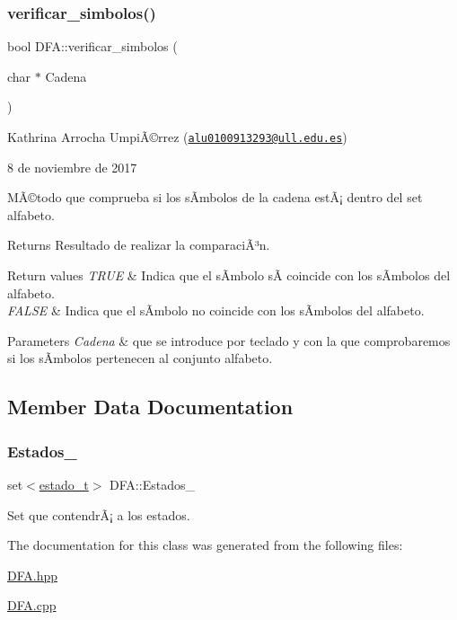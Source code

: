 \subsubsection{\texorpdfstring{verificar\+\_\+simbolos()}{verificar\_simbolos()}}
{\footnotesize\ttfamily bool D\+F\+A\+::verificar\+\_\+simbolos (\begin{DoxyParamCaption}\item[{char $\ast$}]{Cadena }\end{DoxyParamCaption})}

Kathrina Arrocha UmpiÃ©rrez (\href{mailto:alu0100913293@ull.edu.es}{\tt alu0100913293@ull.\+edu.\+es})

8 de noviembre de 2017

MÃ©todo que comprueba si los sÃ­mbolos de la cadena estÃ¡ dentro del set alfabeto.

\begin{DoxyReturn}{Returns}
Resultado de realizar la comparaciÃ³n. 
\end{DoxyReturn}

\begin{DoxyRetVals}{Return values}
{\em T\+R\+UE} & Indica que el sÃ­mbolo sÃ­ coincide con los sÃ­mbolos del alfabeto. \\
\hline
{\em F\+A\+L\+SE} & Indica que el sÃ­mbolo no coincide con los sÃ­mbolos del alfabeto.\\
\hline
\end{DoxyRetVals}

\begin{DoxyParams}{Parameters}
{\em Cadena} & que se introduce por teclado y con la que comprobaremos si los sÃ­mbolos pertenecen al conjunto alfabeto. \\
\hline
\end{DoxyParams}


\subsection{Member Data Documentation}
\mbox{\label{class_d_f_a_a6030e3446246552a16a7de723b08964e}} 
\subsubsection{\texorpdfstring{Estados\+\_\+}{Estados\_}}
{\footnotesize\ttfamily set$<$\hyperlink{classestado__t}{estado\+\_\+t}$>$ D\+F\+A\+::\+Estados\+\_\+}

Set que contendrÃ¡ a los estados. 

The documentation for this class was generated from the following files\+:\begin{DoxyCompactItemize}
\item 
\hyperlink{_d_f_a_8hpp}{D\+F\+A.\+hpp}\item 
\hyperlink{_d_f_a_8cpp}{D\+F\+A.\+cpp}\end{DoxyCompactItemize}

